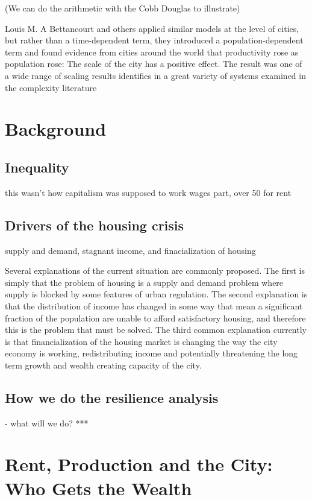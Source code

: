 (We can do the arithmetic with the Cobb Douglas to illustrate)

Louis M. A Bettancourt and others applied similar models at the level of cities, but rather than a time-dependent term, they introduced a population-dependent term and found evidence from cities around the world that productivity rose as population rose: The scale of the city has a positive effect. The result  was one of a wide range of scaling results identifies in a great variety of systems examined in the complexity literature 


\section{Background}

\subsection{Inequality}
this wasn't how capitalism was supposed to work
wages part, 
over 50 for rent

\subsection{Drivers of the housing crisis}
supply and demand, stagnant income, and finacialization of housing

Several explanations of the current situation are commonly proposed. The first is simply that the problem of housing is a supply and demand problem where supply is blocked by some features of urban regulation. The second explanation is that the distribution of income has changed in some way that mean a significant fraction of the population are unable to afford satisfactory housing, and therefore this is the problem that must be solved.  The third common explanation currently is that financialization of the housing market  is changing the way the city economy is working, redistributing income and potentially threatening the long term growth and wealth creating capacity of the city.


\subsection{How we do the resilience analysis}

- what will we do? *** 



\section{Rent, Production and the City: Who Gets the Wealth}


